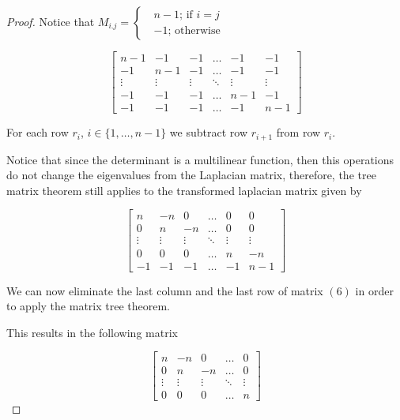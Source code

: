 \documentclass[12pt]{article}
\begin{document}
\begin{enumerate}
\begin{proof}
    Notice that $M_{i.j}= \begin{cases} \textrm{ $n-1$; if $i=j$}\\ \textrm{ $-1$; otherwise} \end{cases}$
    
    \begin{equation}
        \begin{bmatrix}
        n-1 & -1  & -1 & \ldots & -1 & -1\\
        -1  & n-1 & -1 & \ldots & -1 & -1 \\
        \vdots & \vdots & \vdots & \ddots & \vdots & \vdots  \\
        -1 & -1 &  -1 & \ldots & n-1 & -1 \\
        -1 & -1 & -1 & \ldots & -1 & n-1
        
        \end{bmatrix}
    \end{equation}
    
    For each row $r_i$, $i \in \{1, \ldots, n-1\}$ we subtract row $r_{i+1}$ from row $r_i$.
    
    Notice that since the determinant is a multilinear function, then this operations do not change the eigenvalues from the Laplacian matrix, therefore, the tree matrix theorem still applies to the transformed laplacian matrix given by
    
        \begin{equation}
        \begin{bmatrix}
        n & -n  & 0 & \ldots & 0 & 0\\
        0  & n & -n & \ldots & 0 & 0 \\
        \vdots & \vdots & \vdots & \ddots & \vdots & \vdots  \\
        0 & 0 &  0 & \ldots & n & -n \\
        -1 & -1 & -1 & \ldots & -1 & n-1
        \end{bmatrix}
    \end{equation}
    
    We can now eliminate the last column and the last row of matrix $(6)$ in order to apply the matrix tree theorem.
    
    This results in the following matrix
    
    \begin{equation}
        \begin{bmatrix}
        n & -n  & 0 & \ldots & 0 \\
        0  & n & -n & \ldots & 0 \\
        \vdots & \vdots & \vdots & \ddots & \vdots \\
        0 & 0 &  0 & \ldots & n 
        \end{bmatrix}
    \end{equation}
    

\end{proof}
\end{enumerate}
\end{document}
